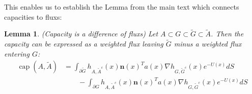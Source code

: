 \documentclass[english, aip, jcp, priprint, graphicx,floatfix]{revtex4-1}
\newtheorem{lemma}{Lemma}
\theoremstyle{plain}
\theoremstyle{definition}
\theoremstyle{plain}
\begin{document}
This enables us to establish the Lemma from the main text which connects capacities to fluxs:

\begingroup
\def\thelemma{\ref{lem:capacity_lemma}}
\begin{lemma}(Capacity is a difference of fluxs)  Let $A\subset G \subset \tilde G \subset \tilde A$.  Then the capacity can be expressed as a weighted flux leaving $\tilde G$ minus a weighted flux entering $G$:
\begin{align*}
\ensuremath{\operatorname{cap}} (A, \tilde{A}) &= \int_{\partial \tilde G}  h_{A, \tilde{A}^c} (x)   \textbf{n}(x)^T a (x) \nabla h_{G, \tilde{G}^c} (x)e^{- U (x)} dS \\
&\qquad - \int_{\partial G}  h_{A, \tilde{A}^c} (x)   \textbf{n}(x)^T a (x) \nabla h_{G, \tilde{G}^c} (x)e^{- U (x)} dS 
\end{align*}
\end{lemma}
\addtocounter{lemma}{-1}
\endgroup
\end{document}
